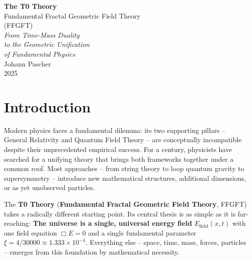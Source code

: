 \documentclass[11pt,openright,twoside]{book}
\begin{document}
\frontmatter
\pagestyle{fancy}
\makeatletter
\let\ps@plain\ps@fancy
\let\ps@empty\ps@fancy
\makeatother

\begin{titlepage}
	\centering
	\vspace*{2cm}
	
	{\Huge\bfseries The T0 Theory}\\[0.8cm]
	{\LARGE Fundamental Fractal Geometric Field Theory}\\[0.5cm]
	{\LARGE (FFGFT)}\\[1.5cm]
	
	{\Large\itshape From Time-Mass Duality\\[0.3cm]
		to the Geometric Unification\\[0.3cm]
		of Fundamental Physics}\\[2cm]
	
	{\large Johann Pascher}\\[1cm]
	
	{\large 2025}
	
	\vfill
\end{titlepage}

\chapter*{Introduction}

Modern physics faces a fundamental dilemma: its two supporting pillars -- General Relativity and Quantum Field Theory -- are conceptually incompatible despite their unprecedented empirical success. For a century, physicists have searched for a unifying theory that brings both frameworks together under a common roof. Most approaches -- from string theory to loop quantum gravity to supersymmetry -- introduce new mathematical structures, additional dimensions, or as yet unobserved particles.

The \textbf{T0 Theory} (\textbf{Fundamental Fractal Geometric Field Theory}, FFGFT) takes a radically different starting point. Its central thesis is as simple as it is far-reaching: \textbf{The universe is a single, universal energy field} $E_{\text{field}}(x,t)$ with one field equation $\Box E = 0$ and a single fundamental parameter $\xi = 4/30000 \approx 1.333 \times 10^{-4}$. Everything else -- space, time, mass, forces, particles -- emerges from this foundation by mathematical necessity.
\end{document}

